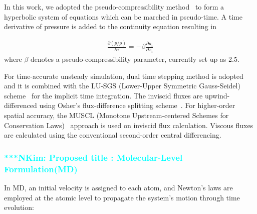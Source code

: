 \documentclass[preprint,12pt]{elsarticle}
\newcommand{\Nkimnote}[1]{ {\textcolor{cyan} { ***NKim: #1 }}}
\newcommand{\Nkimnote}[1]{}
\begin{document}

In this work, we adopted the pseudo-compressibility method~\cite{PseudoCompressibility} to form a hyperbolic system of equations which can be marched in pseudo-time.
A time derivative of pressure is added to the continuity equation resulting in

\vspace{-.2em}
\begin{eqnarray}
\frac{\partial (p/\rho)}{\partial \tau} = - \beta \frac{\partial {u}_{i}}{\partial {x}_{i}}
\end{eqnarray}
where $\beta$ denotes a pseudo-compressibility parameter, currently set up as 2.5.

For time-accurate unsteady simulation, dual time stepping method is adopted and it is combined with the LU-SGS (Lower-Upper Symmetric Gauss-Seidel) scheme~\cite{LU-SGS} for the implicit time integration. The inviscid fluxes are upwind-differenced using Osher's flux-difference splitting scheme~\cite{Osher}. For higher-order spatial accuracy, the MUSCL (Monotone Upstream-centered Schemes for Conservation Laws)~\cite{MUSCL} approach is used on inviscid flux calculation. Viscous fluxes are calculated using the conventional second-order central differencing.


\subsubsection{
\Nkimnote{Proposed title : Molecular-Level Formulation(MD)}
}

In MD, an initial velocity is assigned to each atom, and Newton's laws are employed at the atomic level to propagate the system's motion through time evolution:
\end{document}
